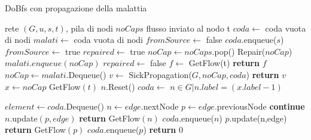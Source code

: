 \documentclass{article}
\begin{document}
\begin{algorithm}
    \caption{DoBfs con propagazione della malattia}
    \begin{algorithmic}
        \REQUIRE rete $(G,u,s,t)$, pila di nodi $noCaps$
        \ENSURE flusso inviato al nodo t
        \STATE $coda \leftarrow$ coda vuota di nodi
        \STATE $malati \leftarrow $ coda vuota di nodi
        \STATE $fromSource \leftarrow$ false
        \STATE $coda$.enqueue($s$)
        \STATE $fromSource \leftarrow $ true
        \ELSE
        \STATE $repaired \leftarrow $ true
        \STATE $noCap \leftarrow noCaps.$pop()
        \STATE Repair($noCap$) 
        \STATE $malati.enqueue(noCap)$
        \STATE $repaired \leftarrow $ false
        \ENDIF
        \ENDWHILE
        \STATE $f \leftarrow$ GetFlow(t) 
        \STATE \textbf{return} $f$
        \ENDIF
        \STATE $noCap \leftarrow malati.$Dequeue()
        \STATE $v \leftarrow$ SickPropagation($G,noCap,coda$)
        \STATE \textbf{return} $v$
        \ENDIF
        \STATE $x \leftarrow noCap$
        \ENDIF
        \ENDWHILE
        \STATE GetFlow$(t)$
        \ENDIF
        \STATE $n.$Reset()
        \ENDFOR
        \STATE $coda \leftarrow$ $n \in G | n.label = (x.label - 1)$
        \ENDIF
        \ENDIF
    \end{algorithmic}
\end{algorithm}
\newpage
\begin{algorithm}
    \begin{algorithmic}
        \STATE $element \leftarrow coda$.Dequeue()
        \STATE $n \leftarrow edge.$nextNode
        \STATE $p \leftarrow edge$.previousNode
         
        \STATE \textbf{continue}
        \ENDIF
        \STATE $n.$update$(p,edge)$ 
        \STATE \textbf{return} GetFlow$(n)$
        \ELSE
        \STATE $coda$.enqueue($n$)
        \ENDIF
        \STATE $p$.update(n,edge)
        \STATE \textbf{return} GetFlow$(p)$
        \ELSE
        \STATE $coda$.enqueue($p$)
        \ENDIF
        \ENDIF
        \ENDFOR
        \ENDWHILE
        \STATE \textbf{return} 0

    \end{algorithmic}
\end{algorithm}
\end{document}
